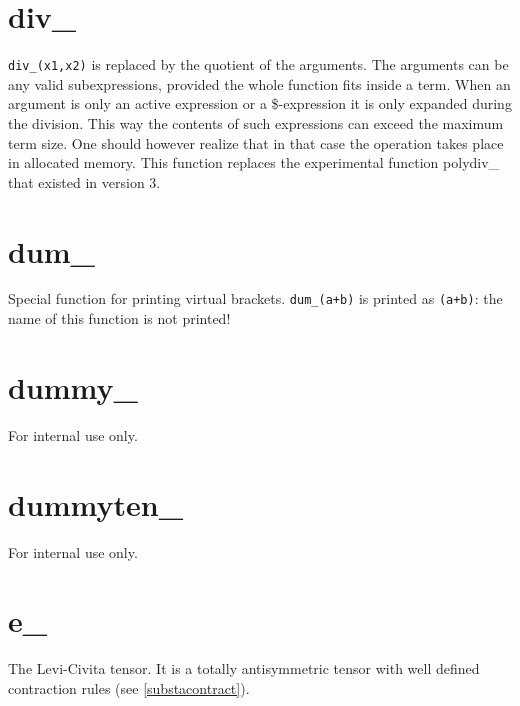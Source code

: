 
\section{div\_}
\label{fundiv}
\noindent \verb:div_(x1,x2): is replaced by the quotient of the arguments. 
The arguments can be any valid subexpressions, provided the whole function 
fits inside a term. When an argument is only an active expression or a 
\$-expression it is only expanded during the division. This way the 
contents of such expressions can exceed the maximum term size. One should 
however realize that in that case the operation takes place in allocated 
memory. This function replaces the experimental function 
polydiv\_ that existed in 
version 3.


\section{dum\_}
\label{fundum}
\noindent Special function for printing virtual 
brackets. \verb:dum_(a+b): is printed as \verb:(a+b):: the 
name of this function is not printed!


\section{dummy\_}
\label{fundummy}
\noindent For internal use only.


\section{dummyten\_}
\label{fundummyten}
\noindent For internal use only.


\section{e\_}
\label{fune}
\noindent The Levi-Civita 
tensor. It is a totally 
antisymmetric tensor with well defined contraction 
rules (see \ref{substacontract}).

